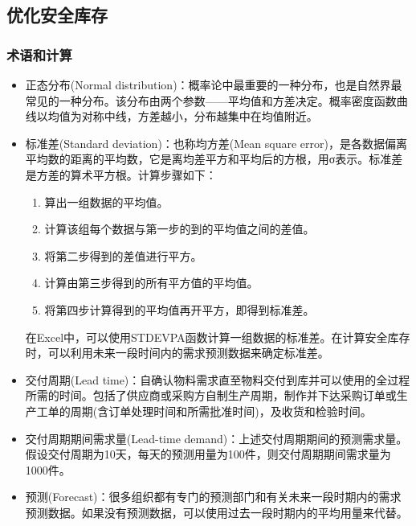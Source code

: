 \subsection { 优化安全库存}

\subsubsection { 术语和计算}

    \begin{itemize}
        \item  正态分布(Normal distribution)：概率论中最重要的一种分布，也是自然界最常见的一种分布。该分布由两个参数——平均值和方差决定。概率密度函数曲线以均值为对称中线，方差越小，分布越集中在均值附近。

        \item  标准差(Standard deviation)：也称均方差(Mean square error)，是各数据偏离平均数的距离的平均数，它是离均差平方和平均后的方根，用σ表示。标准差是方差的算术平方根。计算步骤如下：

        \begin{enumerate}
            \item  算出一组数据的平均值。
            \item  计算该组每个数据与第一步的到的平均值之间的差值。
            \item  将第二步得到的差值进行平方。
            \item  计算由第三步得到的所有平方值的平均值。
            \item  将第四步计算得到的平均值再开平方，即得到标准差。
        \end{enumerate}

        在Excel中，可以使用STDEVPA函数计算一组数据的标准差。在计算安全库存时，可以利用未来一段时间内的需求预测数据来确定标准差。

        \item  交付周期(Lead time)：自确认物料需求直至物料交付到库并可以使用的全过程所需的时间。包括了供应商或采购方自制生产周期，制作并下达采购订单或生产工单的周期(含订单处理时间和所需批准时间)，及收货和检验时间。

        \item  交付周期期间需求量(Lead-time demand)：上述交付周期期间的预测需求量。假设交付周期为10天，每天的预测用量为100件，则交付周期期间需求量为1000件。

        \item  预测(Forecast)：很多组织都有专门的预测部门和有关未来一段时期内的需求预测数据。如果没有预测数据，可以使用过去一段时期内的平均用量来代替。


\end{itemize}
